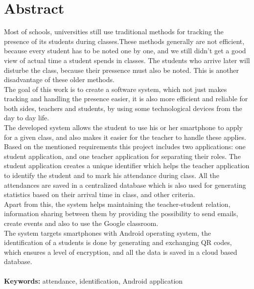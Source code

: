 \documentclass[12pt]{article}
\numberwithin{figure}{section}
\numberwithin{equation}{section}
\begin{document}
\section*{Abstract}
Most of schools, universities still use traditional methods for tracking the presence of its students during classes.These methods generally are not efficient, because every student has to be noted one by one, and we still didn’t get a good view of actual time a student spends in classes. The students who arrive later will disturbe the class, because their pressence must also be noted. This is another disadvantage of these older methods.\\
The goal of this work is to create a software system, which not just makes tracking and handling the presence easier, it is also more efficient and reliable for both sides, teachers and students, by using some technological devices from the day to day life.\\
The developed system allows the student to use his or her smartphone to apply for a given class, and also makes it easier for the teacher to handle these applies.
Based on the mentioned requirements this project includes two applications: one student application, and one teacher application for separating their roles. The student application creates a unique identifier which helps the teacher application to identify the student and to mark his attendance during class. All the attendances are saved in a centralized database which is also used for generating statistics based on their arrival time in class, and other criteria.\\
Apart from this, the system helps maintaining the teacher-student relation, information sharing between them by providing the possibility to send emails, create events and also to use the Google classroom.\\
The system targets smartphones with Android operating system, the identification of a students is done by generating and exchanging QR codes, which ensures a level of encryption, and all the data is saved in a cloud based database.\\
\\
\textbf{Keywords:} attendance, identification, Android application

\newpage

\thispagestyle{empty}
\tableofcontents
\thispagestyle{empty}

\newpage

\thispagestyle{empty}
\listoffigures
\thispagestyle{empty}
\newpage
\end{document}
